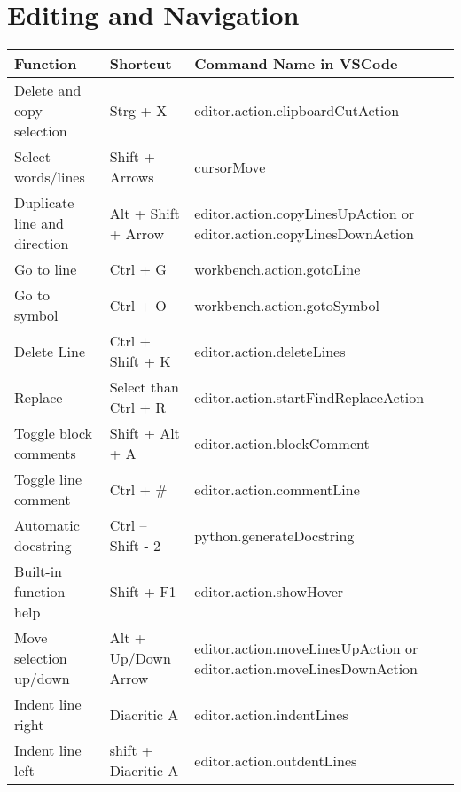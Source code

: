 \documentclass{article}
\begin{document}
\section*{Editing and Navigation}
\begin{longtable}{|p{6cm}|p{3cm}|p{7cm}|}
\hline
\rowcolor{white}
\textbf{Function} & \textbf{Shortcut} & \textbf{Command Name in VSCode} \\
\hline
Delete and copy selection & Strg + X & editor.action.clipboardCutAction \\
Select words/lines & Shift + Arrows & cursorMove \\
Duplicate line and direction & Alt + Shift + Arrow & editor.action.copyLinesUpAction or editor.action.copyLinesDownAction \\
Go to line & Ctrl + G & workbench.action.gotoLine \\
Go to symbol & Ctrl + O & workbench.action.gotoSymbol \\
Delete Line & Ctrl + Shift + K & editor.action.deleteLines \\
Replace & Select than Ctrl + R & editor.action.startFindReplaceAction \\
Toggle block comments & Shift + Alt + A & editor.action.blockComment \\
Toggle line comment & Ctrl + \# & editor.action.commentLine \\
Automatic docstring & Ctrl – Shift - 2 & python.generateDocstring \\
Built-in function help & Shift + F1 & editor.action.showHover \\
Move selection up/down & Alt + Up/Down Arrow & editor.action.moveLinesUpAction or editor.action.moveLinesDownAction \\
Indent line right & Diacritic A & editor.action.indentLines \\
Indent line left & shift + Diacritic A & editor.action.outdentLines \\
\hline
\end{longtable}

\newpage
{}
\end{document}
